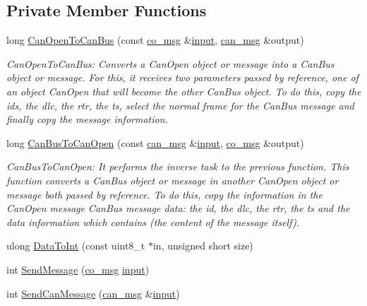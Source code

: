 \subsection*{Private Member Functions}
\begin{DoxyCompactItemize}
\item 
long \hyperlink{classCiA301CommPort_a26346f83700bc8403a315be01c6508e0}{Can\+Open\+To\+Can\+Bus} (const \hyperlink{structco__msg}{co\+\_\+msg} \&\hyperlink{classCiA301CommPort_ae0f955c7141e2067307cea0b48e111d4}{input}, \hyperlink{structcan__msg}{can\+\_\+msg} \&output)
\begin{DoxyCompactList}\small\item\em Can\+Open\+To\+Can\+Bus\+: Converts a Can\+Open object or message into a Can\+Bus object or message. For this, it receives two parameters passed by reference, one of an object Can\+Open that will become the other Can\+Bus object. To do this, copy the ids, the dlc, the rtr, the ts, select the normal frame for the Can\+Bus message and finally copy the message information. \end{DoxyCompactList}\item 
long \hyperlink{classCiA301CommPort_aa16887712ea9cad534aacd4851f9190d}{Can\+Bus\+To\+Can\+Open} (const \hyperlink{structcan__msg}{can\+\_\+msg} \&\hyperlink{classCiA301CommPort_ae0f955c7141e2067307cea0b48e111d4}{input}, \hyperlink{structco__msg}{co\+\_\+msg} \&output)
\begin{DoxyCompactList}\small\item\em Can\+Bus\+To\+Can\+Open\+: It performs the inverse task to the previous function. This function converts a Can\+Bus object or message in another Can\+Open object or message both passed by reference. To do this, copy the information in the Can\+Open message Can\+Bus message data\+: the id, the dlc, the rtr, the ts and the data information which contains (the content of the message itself). \end{DoxyCompactList}\item 
ulong \hyperlink{classCiA301CommPort_a4e62245791e907b5df74e3612f8fc9ce}{Data\+To\+Int} (const uint8\+\_\+t $\ast$in, unsigned short size)
\item 
int \hyperlink{classCiA301CommPort_aeae04455e1e1a1ca1beed9478372c031}{Send\+Message} (\hyperlink{structco__msg}{co\+\_\+msg} \hyperlink{classCiA301CommPort_ae0f955c7141e2067307cea0b48e111d4}{input})
\item 
int \hyperlink{classCiA301CommPort_a700a04da67928ca50744617ece28cde5}{Send\+Can\+Message} (\hyperlink{structcan__msg}{can\+\_\+msg} \&\hyperlink{classCiA301CommPort_ae0f955c7141e2067307cea0b48e111d4}{input})

\end{DoxyCompactItemize}

